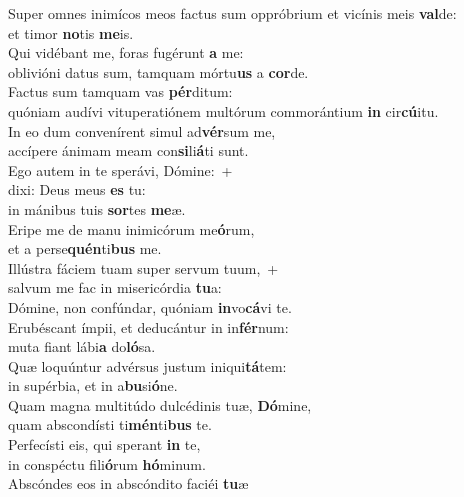 \evenverse Super omnes inimícos meos factus sum oppróbrium et vicínis meis \textbf{val}de:~\*\\
\evenverse et timor \textbf{no}tis \textbf{me}is.\\
\oddverse Qui vidébant me, foras fugérunt \textbf{a} me:~\*\\
\oddverse oblivióni datus sum, tamquam mórtu\textbf{us} a \textbf{cor}de.\\
\evenverse Factus sum tamquam vas \textbf{pér}ditum:~\*\\
\evenverse quóniam audívi vituperatiónem multórum commorántium \textbf{in} cir\textbf{cú}itu.\\
\oddverse In eo dum convenírent simul ad\textbf{vér}sum me,~\*\\
\oddverse accípere ánimam meam con\textbf{si}li\textbf{á}ti sunt.\\
\evenverse Ego autem in te sperávi, Dómine:~+\\
\evenverse  dixi: Deus meus \textbf{es} tu:~\*\\
\evenverse in mánibus tuis \textbf{sor}tes \textbf{me}æ.\\
\oddverse Eripe me de manu inimicórum me\textbf{ó}rum,~\*\\
\oddverse et a perse\textbf{quén}ti\textbf{bus} me.\\
\evenverse Illústra fáciem tuam super servum tuum,~+\\
\evenverse  salvum me fac in misericórdia \textbf{tu}a:~\*\\
\evenverse Dómine, non confúndar, quóniam \textbf{in}vo\textbf{cá}vi te.\\
\oddverse Erubéscant ímpii, et deducántur in in\textbf{fér}num:~\*\\
\oddverse muta fiant lábi\textbf{a} do\textbf{ló}sa.\\
\evenverse Quæ loquúntur advérsus justum iniqui\textbf{tá}tem:~\*\\
\evenverse in supérbia, et in a\textbf{bu}si\textbf{ó}ne.\\
\oddverse Quam magna multitúdo dulcédinis tuæ, \textbf{Dó}mine,~\*\\
\oddverse quam abscondísti ti\textbf{mén}ti\textbf{bus} te.\\
\evenverse Perfecísti eis, qui sperant \textbf{in} te,~\*\\
\evenverse in conspéctu fili\textbf{ó}rum \textbf{hó}minum.\\
\oddverse Abscóndes eos in abscóndito faciéi \textbf{tu}æ~\*\\
